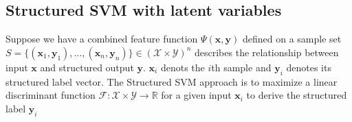 \documentclass{article}
\begin{document}
	\subsection{Structured SVM with latent variables}
	Suppose we have a combined feature function $\Psi(\mathbf{x},\mathbf{y}) $ defined on a sample set $S=\{ ( \mathbf{x}_1,\mathbf{y}_1) ,\dots ,( \mathbf{x}_n,\mathbf{y}_n ) \} \in (\mathcal{X}\times \mathcal{Y})^n$ describes the relationship between input $\mathbf{x}$ and structured output $\mathbf{y}$. $ \mathbf{x}_i$ denots the $i$th sample and $\mathbf{y}_i$ denotes its structured label vector. The Structured SVM approach \cite{tsochantaridis2005large} is to maximize a linear discriminant function $\mathcal{F} : \mathcal{X} \times \mathcal{Y} \rightarrow \mathbb{R} $ for a given input $\mathbf{x}_i$ to derive the structured label $\mathbf{y}_i$
	
\end{document}

